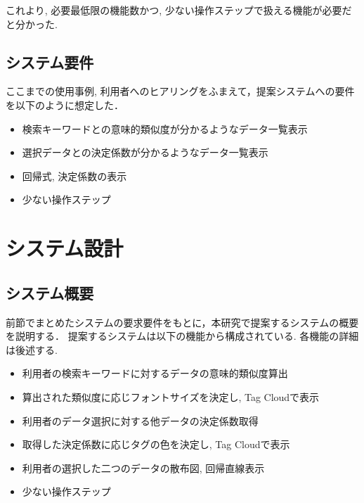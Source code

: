 \documentclass[sotsuron]{kuee}
\begin{document}
これより, 必要最低限の機能数かつ, 少ない操作ステップで扱える機能が必要だと分かった.


\subsection{システム要件}
ここまでの使用事例, 利用者へのヒアリングをふまえて，提案システムへの要件を以下のように想定した．

\begin{itemize}
 \item 検索キーワードとの意味的類似度が分かるようなデータ一覧表示
 \item 選択データとの決定係数が分かるようなデータ一覧表示
 \item 回帰式, 決定係数の表示
 \item 少ない操作ステップ
\end{itemize}

\section{システム設計}


\subsection{システム概要}

前節でまとめたシステムの要求要件をもとに，本研究で提案するシステムの概要を説明する．
提案するシステムは以下の機能から構成されている.
各機能の詳細は後述する.

\begin{itemize}
 \item 利用者の検索キーワードに対するデータの意味的類似度算出
 \item 算出された類似度に応じフォントサイズを決定し, Tag Cloudで表示
 \item 利用者のデータ選択に対する他データの決定係数取得
 \item 取得した決定係数に応じタグの色を決定し, Tag Cloudで表示
 \item 利用者の選択した二つのデータの散布図, 回帰直線表示
 \item 少ない操作ステップ
\end{itemize}
\end{document}
